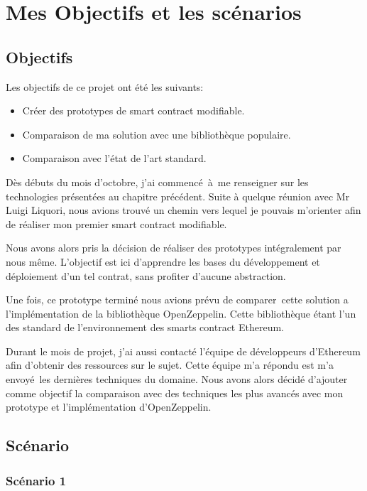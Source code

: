 \section{Mes Objectifs et les scénarios}

\subsection{Objectifs}

Les objectifs de ce projet ont été les suivants:

\begin{itemize}
    \item Créer des prototypes de smart contract modifiable.
    \item Comparaison de ma solution avec une bibliothèque populaire.
    \item Comparaison avec l'état de l'art standard.
\end{itemize}

Dès débuts du mois d'octobre, j'ai commencé à me renseigner sur les technologies présentées au chapitre
précédent. Suite à quelque réunion avec Mr Luigi Liquori, nous avions trouvé un chemin vers
lequel je pouvais m'orienter afin de réaliser mon premier smart contract modifiable.

Nous avons alors pris la décision de réaliser des prototypes intégralement par nous même.
L'objectif est ici d'apprendre les bases du développement et déploiement d'un tel contrat,
sans profiter d'aucune abstraction.

Une fois, ce prototype terminé nous avions prévu de comparer cette solution a l'implémentation
de la bibliothèque OpenZeppelin. Cette bibliothèque étant l'un des standard de l'environnement
des smarts contract Ethereum.

Durant le mois de projet, j'ai aussi contacté l'équipe de développeurs d'Ethereum afin d'obtenir
des ressources sur le sujet. Cette équipe m'a répondu est m'a envoyé les dernières techniques du
domaine. Nous avons alors décidé d'ajouter comme objectif la comparaison avec des techniques les
plus avancés avec mon prototype et l'implémentation d'OpenZeppelin.

\subsection{Scénario}

\subsubsection{Scénario 1}

